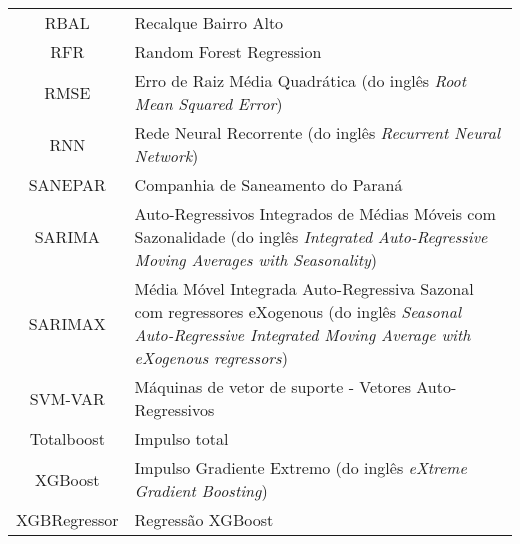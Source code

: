 \begin{tabular}{cp{}}
	RBAL & Recalque Bairro Alto\\
	RFR & Random Forest Regression\\
	RMSE & Erro de Raiz Média Quadrática (do inglês \textit{Root Mean Squared Error})\\
	RNN & Rede Neural Recorrente (do inglês \textit{Recurrent Neural Network})\\
	SANEPAR & Companhia de Saneamento do Paraná \\
	SARIMA & Auto-Regressivos Integrados de Médias Móveis com Sazonalidade (do inglês \textit{Integrated Auto-Regressive Moving Averages with Seasonality}) \\
	SARIMAX &  Média Móvel Integrada Auto-Regressiva Sazonal com regressores eXogenous (do inglês \textit{Seasonal Auto-Regressive Integrated Moving Average with eXogenous regressors}) \\
	SVM-VAR & Máquinas de vetor de suporte - Vetores Auto-Regressivos\\
	Totalboost & Impulso total\\
	XGBoost & Impulso Gradiente Extremo (do inglês \textit{eXtreme Gradient Boosting})\\
	XGBRegressor & Regressão XGBoost
\end{tabular}








\newpage 
{}
\listoftables
\cleardoublepage

\newpage 
{}
\listoffigures 


%


\newpage
{}
\tableofcontents 

